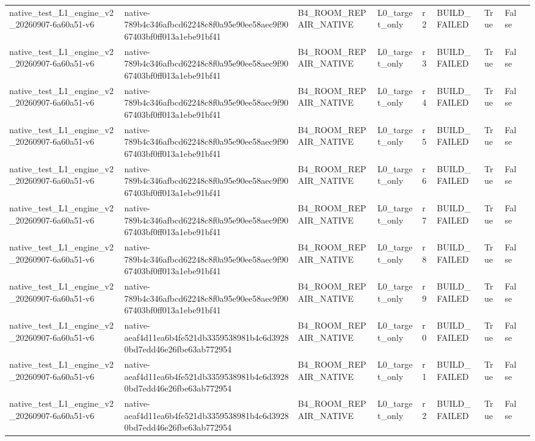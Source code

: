 \begin{tabular}{lllllllll}
native\_test\_L1\_engine\_v2\_20260907-6a60a51-v6 & native-789b4c346afbcd62248c8f0a95e90ee58aec9f9067403bf0ff013a1ebe91bf41 & B4\_ROOM\_REPAIR\_NATIVE & L0\_target\_only & r2 & BUILD\_FAILED & True & False &  \\
native\_test\_L1\_engine\_v2\_20260907-6a60a51-v6 & native-789b4c346afbcd62248c8f0a95e90ee58aec9f9067403bf0ff013a1ebe91bf41 & B4\_ROOM\_REPAIR\_NATIVE & L0\_target\_only & r3 & BUILD\_FAILED & True & False &  \\
native\_test\_L1\_engine\_v2\_20260907-6a60a51-v6 & native-789b4c346afbcd62248c8f0a95e90ee58aec9f9067403bf0ff013a1ebe91bf41 & B4\_ROOM\_REPAIR\_NATIVE & L0\_target\_only & r4 & BUILD\_FAILED & True & False &  \\
native\_test\_L1\_engine\_v2\_20260907-6a60a51-v6 & native-789b4c346afbcd62248c8f0a95e90ee58aec9f9067403bf0ff013a1ebe91bf41 & B4\_ROOM\_REPAIR\_NATIVE & L0\_target\_only & r5 & BUILD\_FAILED & True & False &  \\
native\_test\_L1\_engine\_v2\_20260907-6a60a51-v6 & native-789b4c346afbcd62248c8f0a95e90ee58aec9f9067403bf0ff013a1ebe91bf41 & B4\_ROOM\_REPAIR\_NATIVE & L0\_target\_only & r6 & BUILD\_FAILED & True & False &  \\
native\_test\_L1\_engine\_v2\_20260907-6a60a51-v6 & native-789b4c346afbcd62248c8f0a95e90ee58aec9f9067403bf0ff013a1ebe91bf41 & B4\_ROOM\_REPAIR\_NATIVE & L0\_target\_only & r7 & BUILD\_FAILED & True & False &  \\
native\_test\_L1\_engine\_v2\_20260907-6a60a51-v6 & native-789b4c346afbcd62248c8f0a95e90ee58aec9f9067403bf0ff013a1ebe91bf41 & B4\_ROOM\_REPAIR\_NATIVE & L0\_target\_only & r8 & BUILD\_FAILED & True & False &  \\
native\_test\_L1\_engine\_v2\_20260907-6a60a51-v6 & native-789b4c346afbcd62248c8f0a95e90ee58aec9f9067403bf0ff013a1ebe91bf41 & B4\_ROOM\_REPAIR\_NATIVE & L0\_target\_only & r9 & BUILD\_FAILED & True & False &  \\
native\_test\_L1\_engine\_v2\_20260907-6a60a51-v6 & native-aeaf4d11ea6b4fe521db3359538981b4c6d39280bd7edd46e26fbe63ab772954 & B4\_ROOM\_REPAIR\_NATIVE & L0\_target\_only & r0 & BUILD\_FAILED & True & False &  \\
native\_test\_L1\_engine\_v2\_20260907-6a60a51-v6 & native-aeaf4d11ea6b4fe521db3359538981b4c6d39280bd7edd46e26fbe63ab772954 & B4\_ROOM\_REPAIR\_NATIVE & L0\_target\_only & r1 & BUILD\_FAILED & True & False &  \\
native\_test\_L1\_engine\_v2\_20260907-6a60a51-v6 & native-aeaf4d11ea6b4fe521db3359538981b4c6d39280bd7edd46e26fbe63ab772954 & B4\_ROOM\_REPAIR\_NATIVE & L0\_target\_only & r2 & BUILD\_FAILED & True & False &  \\

\end{tabular}
